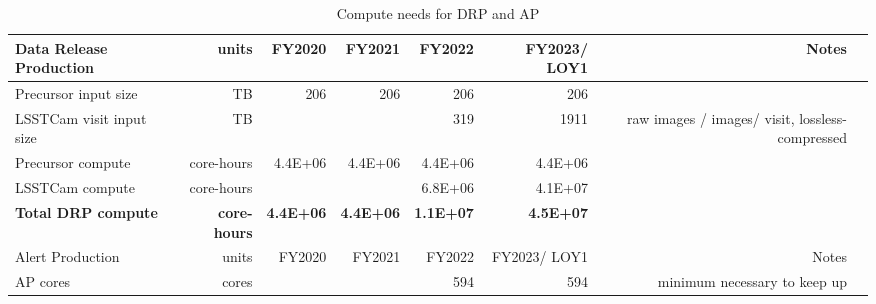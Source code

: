 \tiny \begin{longtable} { |p{}  |r  |r  |r  |r  |r  |r  |r |} 
\caption{Compute needs for DRP and AP \label{tab:drpAndAlertSizing}}\\ 
\hline 
\textbf{Data Release Production}&\textbf{units}&\textbf{FY2020}&\textbf{FY2021}&\textbf{FY2022}&\textbf{FY2023/ LOY1}&\textbf{Notes} \\ \hline
{Precursor input size}&{TB}&{206}&{206}&{206}&{206}& \\ \hline
{LSSTCam visit input size}&{TB}&{}&{}&{319}&{1911}&{raw images /  images/ visit, lossless-compressed} \\ \hline
{Precursor compute}&{core-hours}&{4.4E+06}&{4.4E+06}&{4.4E+06}&{4.4E+06}& \\ \hline
{LSSTCam compute}&{core-hours}&{}&{}&{6.8E+06}&{4.1E+07}& \\ \hline
\textbf{Total DRP compute}&\textbf{core-hours}&\textbf{4.4E+06}&\textbf{4.4E+06}&\textbf{1.1E+07}&\textbf{4.5E+07}& \\ \hline
{Alert Production}&{units}&{FY2020}&{FY2021}&{FY2022}&{FY2023/ LOY1}&{Notes} \\ \hline
{AP cores}&{cores}&{}&{}&{594}&{594}&{minimum necessary to keep up} \\ \hline
\end{longtable} \normalsize
